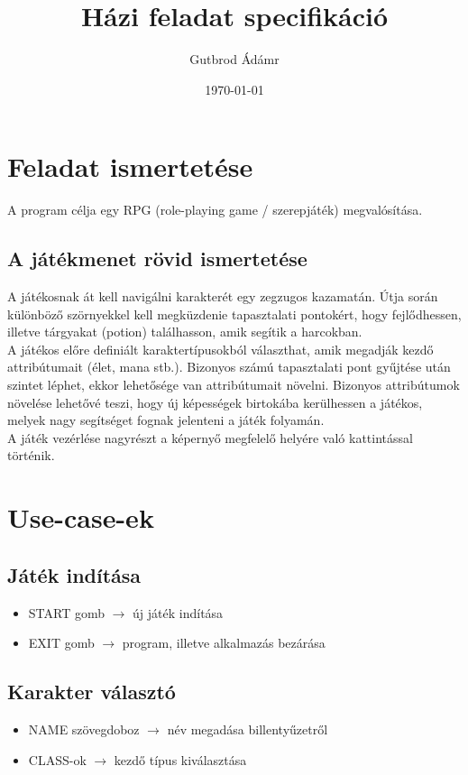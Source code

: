 \documentclass[12pt,a4paper]{article}
\title{\bfseries\Large Házi feladat specifikáció}
\author{Gutbrod Ádámr}
\date{\today}
\begin{document}
	\maketitle
	
	\section{Feladat ismertetése}
	A program célja egy RPG (role-playing game / szerepjáték) megvalósítása. \
	
	\subsection{A játékmenet rövid ismertetése}
	A játékosnak át kell navigálni karakterét egy zegzugos kazamatán.
	Útja során különböző szörnyekkel kell megküzdenie tapasztalati pontokért, hogy fejlődhessen, illetve tárgyakat (potion) találhasson, amik segítik a harcokban. \\
	A játékos előre definiált karaktertípusokból választhat, amik megadják kezdő attribútumait (élet, mana stb.). Bizonyos számú tapasztalati pont gyűjtése után szintet léphet, ekkor lehetősége van attribútumait növelni. Bizonyos attribútumok növelése lehetővé teszi, hogy új képességek birtokába kerülhessen a játékos, melyek nagy segítséget fognak jelenteni a játék folyamán. \\
	A játék vezérlése nagyrészt a képernyő megfelelő helyére való kattintással történik.
	
	
	\section{Use-case-ek}
	\subsection{Játék indítása}
	\begin{itemize}
		\item START gomb $\rightarrow$ új játék indítása
		\item EXIT gomb $\rightarrow$ program, illetve alkalmazás bezárása
	\end{itemize}
	
	\subsection{Karakter választó}
	\begin{itemize}
		\item NAME szövegdoboz $\rightarrow$ név megadása billentyűzetről
		\item CLASS-ok $\rightarrow$ kezdő típus kiválasztása
	\end{itemize}
	
\end{document}
